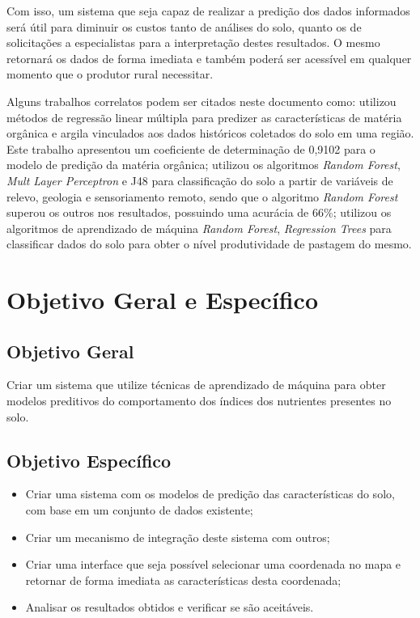 \documentclass[
12pt,				%
oneside,			%
a4paper,			%
english,			%
french,				%
spanish,			%
brazil				%
]{abntex2}
\begin{document}
Com isso, um sistema que seja capaz de realizar a predição dos dados informados será útil para diminuir os custos tanto de análises do solo, quanto os de solicitações a especialistas para a interpretação destes resultados. O mesmo  retornará os dados de forma imediata e também poderá ser acessível em qualquer momento que o produtor rural necessitar.

Alguns trabalhos correlatos podem ser citados neste documento como: \cite{helfer2019tellus} utilizou métodos de regressão linear múltipla para predizer as características de matéria orgânica e argila vinculados aos dados históricos coletados do solo em uma região. Este trabalho apresentou um coeficiente de determinação de 0,9102 para o modelo de predição da matéria orgânica; \cite{da2016prediccao} utilizou os algoritmos \textit{Random Forest}, \textit{Mult Layer Perceptron} e J48 para classificação do solo a partir de variáveis de relevo, geologia e sensoriamento remoto, sendo que o algoritmo \textit{Random Forest} superou os outros nos resultados, possuindo uma acurácia de 66\%; \cite{daprevisao}  utilizou os algoritmos de aprendizado de máquina \textit{Random Forest}, \textit{Regression Trees} para classificar dados do solo para obter o nível produtividade de pastagem do mesmo. 
   

\chapter{Objetivo Geral e Específico}

\section{Objetivo Geral}

Criar um sistema que utilize técnicas de aprendizado de máquina para obter modelos preditivos do comportamento dos índices dos nutrientes presentes no solo.


\section{Objetivo Específico}

\begin{itemize}
	
	\item Criar uma sistema com os modelos de predição das características do solo, com base em  um conjunto de dados existente;
	
	\item Criar um mecanismo de integração deste sistema com outros;
	
	\item Criar uma interface que seja possível selecionar uma coordenada no mapa e retornar de forma imediata as características desta coordenada;
	
	\item Analisar os resultados obtidos e verificar se são aceitáveis.
	
	
\end{itemize}
\end{document}
